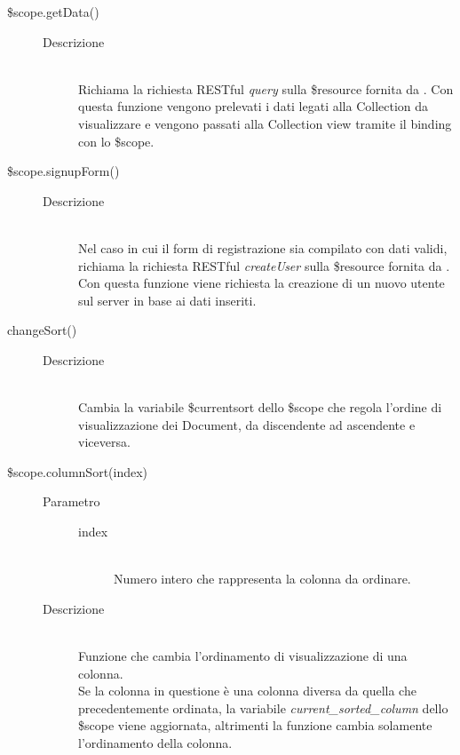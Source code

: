 \begin{description}
\begin{description}
  \item[\$scope.getData()] \hfill
    \begin{description}
  	\item[Descrizione] \hfill \\
  Richiama la richiesta RESTful \textit{query} sulla \$resource fornita da .
  Con questa funzione vengono prelevati i dati legati alla Collection da visualizzare e vengono
  passati alla Collection view tramite il binding con lo \$scope. \\
  
      \end{description}

  \item[\$scope.signupForm()] \hfill
  \begin{description}
   	\item[Descrizione] \hfill \\
  Nel caso in cui il form di registrazione sia compilato con dati validi, richiama la richiesta RESTful \textit{createUser} sulla \$resource 
  fornita da .
  Con questa funzione viene richiesta la creazione di  un nuovo utente sul server in base ai dati inseriti.
   \end{description}

  
  \item[changeSort()] \hfill
    \begin{description}
  	\item[Descrizione] \hfill \\
  Cambia la variabile \$current\textunderscore sort dello \$scope che regola l'ordine di visualizzazione dei Document, da discendente ad ascendente e viceversa.
      \end{description}
      
  \item[\$scope.columnSort(index)] \hfill
  \begin{description}
  	\item[Parametro] \hfill
  		\begin{description}
  			\item[index] \hfill \\
  			Numero intero che rappresenta la colonna da ordinare.
       \end{description}
  	\item[Descrizione] \hfill \\
        Funzione che cambia l'ordinamento di visualizzazione di una colonna. \\
  Se la colonna in questione è una colonna diversa da quella che precedentemente ordinata, la variabile \textit{current\_sorted\_column} dello \$scope viene aggiornata, altrimenti la funzione cambia solamente
  l'ordinamento della colonna.
    \end{description}


\end{description}
\end{description}
